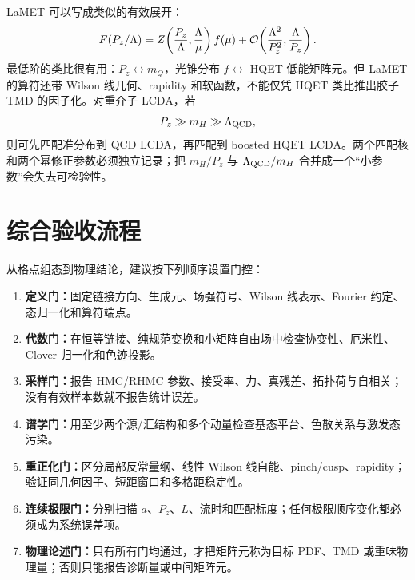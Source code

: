 LaMET 可以写成类似的有效展开：
\begin{equation}
  F(P_z/\Lambda)
  =Z\!\left(\frac{P_z}{\Lambda},\frac{\Lambda}{\mu}\right)f(\mu)
  +\mathcal{O}\!\left(\frac{\Lambda^2}{P_z^2},\frac{\Lambda}{P_z}\right).
  \label{eq:lamet-expansion}
\end{equation}
最低阶的类比很有用：\(P_z\leftrightarrow m_Q\)，光锥分布 \(f\leftrightarrow\) HQET 低能矩阵元。但 LaMET 的算符还带 Wilson 线几何、rapidity 和软函数，不能仅凭 HQET 类比推出胶子 TMD 的因子化。对重介子 LCDA，若
\begin{equation}
  P_z\gg m_H\gg\Lambda_{\rm QCD},
  \label{eq:bhqet-hierarchy}
\end{equation}
则可先匹配准分布到 QCD LCDA，再匹配到 boosted HQET LCDA。两个匹配核和两个幂修正参数必须独立记录；把 \(m_H/P_z\) 与 \(\Lambda_{\rm QCD}/m_H\) 合并成一个“小参数”会失去可检验性。

\chapter{综合验收流程}

从格点组态到物理结论，建议按下列顺序设置门控：
\begin{enumerate}
  \item \textbf{定义门：}固定链接方向、生成元、场强符号、Wilson 线表示、Fourier 约定、态归一化和算符端点。
  \item \textbf{代数门：}在恒等链接、纯规范变换和小矩阵自由场中检查协变性、厄米性、Clover 归一化和色迹投影。
  \item \textbf{采样门：}报告 HMC/RHMC 参数、接受率、力、真残差、拓扑荷与自相关；没有有效样本数就不报告统计误差。
  \item \textbf{谱学门：}用至少两个源/汇结构和多个动量检查基态平台、色散关系与激发态污染。
  \item \textbf{重正化门：}区分局部反常量纲、线性 Wilson 线自能、pinch/cusp、rapidity；验证同几何因子、短距窗口和多格距稳定性。
  \item \textbf{连续极限门：}分别扫描 \(a\)、\(P_z\)、\(L\)、流时和匹配标度；任何极限顺序变化都必须成为系统误差项。
  \item \textbf{物理论述门：}只有所有门均通过，才把矩阵元称为目标 PDF、TMD 或重味物理量；否则只能报告诊断量或中间矩阵元。
\end{enumerate}
